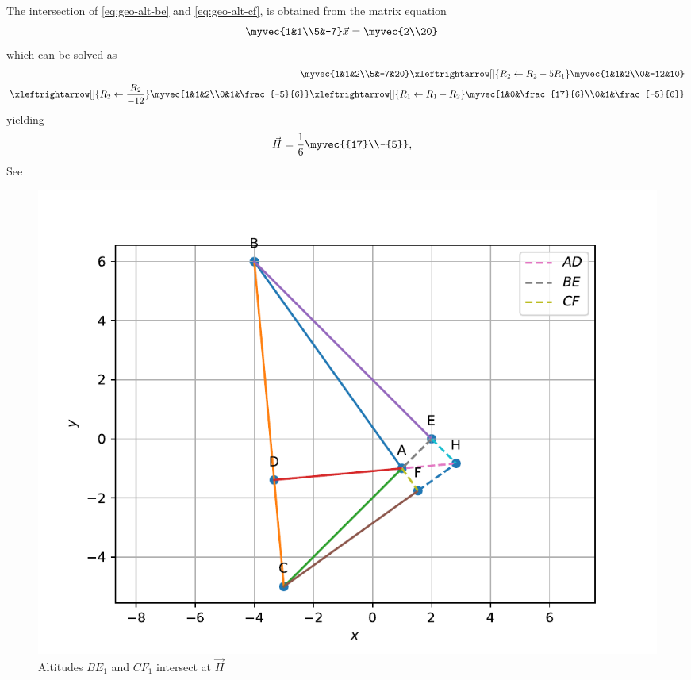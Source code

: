 \\ \solution
%
The intersection of 
		\eqref{eq:geo-alt-be}
		and
		\eqref{eq:geo-alt-cf},
		is obtained from 
		the matrix equation
\begin{align}
        \myvec{1&1\\5&-7} \vec{x} &= \myvec{2\\20}
\end{align}
%
which can be solved as 
%
\begin{align}
        \myvec{1&1&2\\5&-7&20}
	 \xleftrightarrow[]{R_2 \leftarrow R_2 - 5R_1}
        \myvec{1&1&2\\0&-12&10}\\
	 \xleftrightarrow[]{R_2 \leftarrow \frac{R_2}{-12}}
        \myvec{1&1&2\\0&1&\frac{-5}{6}}
	 \xleftrightarrow[]{R_1 \leftarrow R_1 - R_2}
        \myvec{1&0&\frac{17}{6}\\0&1&\frac{-5}{6}}
\end{align}
%
yielding
%
\begin{align}
        \vec{H}&=\frac{1}{6}\myvec{{17}\\-{5}}
		\label{eq:geo-alt-H},
\end{align}
%
See 
\begin{figure}[!ht]
\centering
\includegraphics[width=\columnwidth]{figs/triangle/altitude.pdf}
\caption{Altitudes $BE_1$ and $CF_1$ intersect at $\vec{H}$}
\label{fig:m_tri_py}
\end{figure}

